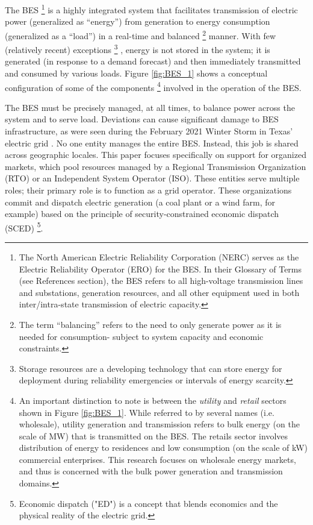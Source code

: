 The BES \footnote{The North American Electric Reliability Corporation (NERC) serves as the Electric Reliability Operator (ERO) for the BES. In their Glossary of Terms (see References section), the BES refers to all high-voltage transmission lines and substations, generation resources, and all other equipment used in both inter/intra-state transmission of electric capacity.}
is a highly integrated system that facilitates transmission of electric power (generalized as “energy”) from generation to energy consumption (generalized as a “load”) in a real-time and balanced \footnote{The term “balancing” refers to the need to only generate power as it is needed for consumption- subject to system capacity and economic constraints.}
manner. With few (relatively recent) exceptions \footnote{Storage resources are a developing technology that can store energy for deployment during reliability emergencies or intervals of energy scarcity.}
, energy is not stored in the system; it is generated (in response to a demand forecast) and then immediately transmitted and consumed by various loads. Figure \ref{fig:BES_1} shows a conceptual configuration of some of the components \footnote{An important distinction to note is between the \textit{utility} and \textit{retail} sectors shown in Figure \ref{fig:BES_1}. While referred to by several names (i.e. wholesale), utility generation and transmission refers to bulk energy (on the scale of MW) that is transmitted on the BES. The retails sector involves distribution of energy to residences and low consumption (on the scale of kW) commercial enterprises. This research focuses on wholesale energy markets, and thus is concerned with the bulk power generation and transmission domains.}
involved in the operation of the BES. \cite{devasia}

The BES must be precisely managed, at all times, to balance power across the system and to serve load. Deviations can cause significant damage to BES infrastructure, as were seen during the February 2021 Winter Storm in Texas' electric grid \cite{balancing1}.
No one entity manages the entire BES. Instead, this job is shared across geographic locales. This paper focuses specifically on support for organized markets, which pool resources managed by a Regional Transmission Organization (RTO) or an Independent System Operator (ISO). These entities serve multiple roles; their primary role is to function as a grid operator. These organizations commit and dispatch electric generation (a coal plant or a wind farm, for example) based on the principle of security-constrained economic dispatch (SCED)
\footnote{Economic dispatch ("ED") is a concept that blends economics and the physical reality of the electric grid.}.

